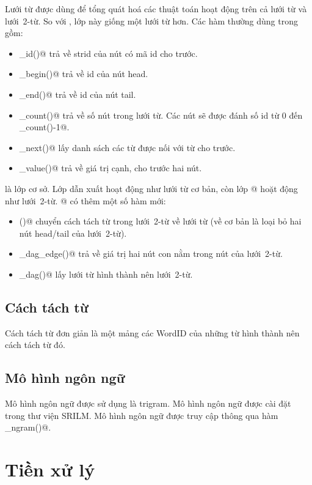\documentclass[a4paper,oneside,14pt]{extbook} %
\begin{document}
Lưới từ \verb@DAG@ được dùng để tổng quát hoá các thuật toán hoạt động
trên cả lưới từ và lưới~2-từ. So với \verb@Lattice@, lớp này giống một
lưới từ hơn. Các hàm thường dùng trong \verb@DAG@ gồm:
\begin{itemize}
\item \verb@node_id()@ trả về strid của nút có mã id cho trước.
\item \verb@node_begin()@ trả về id của nút head.
\item \verb@node_end()@ trả về id của nút tail.
\item \verb@node_count()@ trả về số nút trong lưới từ. Các nút sẽ được
  đánh số id từ 0 đến \verb@node_count()-1@.
\item \verb@get_next()@ lấy danh sách các từ được nối với từ cho
  trước.
\item \verb@edge_value()@ trả về giá trị cạnh, cho trước hai nút.
\end{itemize}

\verb@DAG@ là lớp cơ sở. Lớp dẫn xuất \verb@WordDAG@ hoạt động như
lưới từ cơ bản, còn lớp @ hoặt động như lưới~2-từ.
@ có thêm một số hàm mới:
\begin{itemize}
\item \verb@demangle()@ chuyển cách tách từ trong lưới~2-từ về lưới từ
  (về cơ bản là loại bỏ hai nút head/tail của lưới~2-từ).
\item \verb@node_dag_edge()@ trả về giá trị hai nút con nằm trong nút
  của lưới~2-từ.
\item \verb@get_dag()@ lấy lưới từ hình thành nên lưới~2-từ.
\end{itemize}


\subsection{Cách tách từ}

Cách tách từ đơn giản là một mảng các WordID của những từ hình thành
nên cách tách từ đó.

\subsection{Mô hình ngôn ngữ}

Mô hình ngôn ngữ được sử dụng là tri\-gram. Mô hình ngôn ngữ được cài
đặt trong thư viện SRILM. Mô hình ngôn ngữ được truy cập thông qua hàm
\verb@get_n\-gram()@. 

\section{Tiền xử lý}
\end{document}
